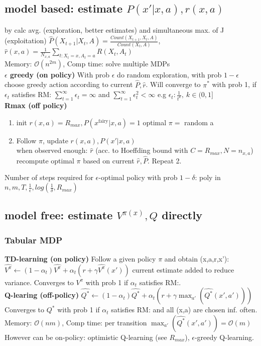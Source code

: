 \subsection{model based: estimate $P(x'|x,a), r(x,a)$}
by calc avg. (exploration, better estimates) and simultaneous max. of J (exploitation)
$\hat{P}(X_{t+1}|X_{t},A) = \frac{Count(X_{t+1}, X_{t}, A)}{Count(X_t, A)}$,
$\hat{r}(x,a) = \frac{1}{N_{x,a}} \sum_{t:X_{t}=x, A_t=a} R(X_t, A_t)$\\
Memory: $\mathcal{O}(n^{2m})$, Comp time: solve multiple MDPs\\
\textbf{$\epsilon$ greedy (on policy)}
With prob $\epsilon$ do random exploration, with prob $1-\epsilon$ choose greedy action according to current
$\hat{P}, \hat{r}$.
Will converge to $\pi^{*}$ with prob 1, if $\epsilon_{t}$ satisfies \color{magenta}RM:\color{black}
$\sum_{t=1}^{\infty}\epsilon_{t} = \infty$ and $\sum_{t=1}^{\infty}\epsilon_{t}^{2} < \infty$
e.g $\epsilon_{t}:\frac{1}{t^{k}},\ k \in (0,1]$\\
\textbf{Rmax (off policy)}
\begin{enumerate}
    \item init $r(x,a) = R_{max}, P(x^{\text{fairy}}|x,a)=1$ \textrightarrow optimal $\pi=$ random a
    \item Follow $\pi$, update $r(x,a), P(x'|x,a)$\\
    when observed enough: $\hat{r}$ (acc. to Hoeffding bound with $C=R_{max}, N=n_{x,a}$)\\
        recompute optimal $\pi$ based on current $\hat{r}, \hat{P}$. Repeat 2.
\end{enumerate}
Number of steps required for $\epsilon$-optimal policy with prob $1-\delta$:
poly in $n,m,T,\frac{1}{\epsilon}, log(\frac{1}{\delta}, R_{max})$


\subsection{model free: estimate $V^{\pi(x)}, Q$ directly}


\subsubsection{Tabular MDP}

\textbf{TD-learning (on policy)}
Follow a given policy $\pi$ and obtain (x,a,r,x'):
$\hat{V^\pi} \leftarrow (1-\alpha_{t})\hat{V^\pi} + \alpha_t (r + \gamma \hat{V^\pi}(x'))$
current estimate added to reduce variance.
Converges to $V^\pi$ with prob 1 if $\alpha_{t}$ satisfies \color{magenta}RM:\color{black}.\\
\textbf{Q-learing (off-policy)}
$\hat{Q^*} \leftarrow (1-\alpha_{t})\hat{Q^*} + \alpha_t (r + \gamma \max_{a'}(\hat{Q^*}(x',a')))$
Converges to $Q^*$ with prob 1 if $\alpha_{t}$ satisfies \color{magenta}RM:\color{black} and
all (x,a) are chosen inf. often.
Memory: $\mathcal{O}(nm)$, Comp time: per transition $\max_{a'}(\hat{Q^*}(x',a')) = \mathcal{O}(m)$
However can be on-policy:
optimistic Q-learning (see $R_{max}$), $\epsilon$-greedy Q-learning.

